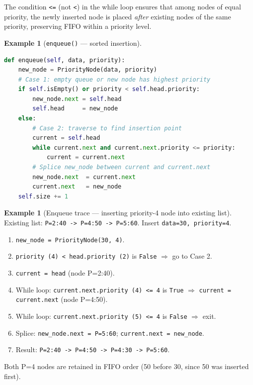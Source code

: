 \documentclass[11pt, a4paper, notitlepage]{report}
\theoremstyle{definition}
\theoremstyle{remark}
\theoremstyle{definition}
\newtheorem{example}[theorem]{Example}
\begin{document}
The condition \texttt{<=} (not \texttt{<}) in the while loop ensures that among nodes of
equal priority, the newly inserted node is placed \emph{after} existing nodes of the same
priority, preserving FIFO within a priority level.

\begin{example}[\texttt{enqueue()} --- sorted insertion]
\label{ex:pq-enqueue}
\leavevmode
\begin{lstlisting}[language=Python]
def enqueue(self, data, priority):
    new_node = PriorityNode(data, priority)
    # Case 1: empty queue or new node has highest priority
    if self.isEmpty() or priority < self.head.priority:
        new_node.next = self.head
        self.head     = new_node
    else:
        # Case 2: traverse to find insertion point
        current = self.head
        while current.next and current.next.priority <= priority:
            current = current.next
        # Splice new_node between current and current.next
        new_node.next  = current.next
        current.next   = new_node
    self.size += 1
\end{lstlisting}
\end{example}

\begin{example}[Enqueue trace --- inserting priority-4 node into existing list]
\label{ex:pq-enqueue-trace}
Existing list: \texttt{P=2:40 -> P=4:50 -> P=5:60}.  Insert \texttt{data=30, priority=4}.

\begin{enumerate}
  \item \texttt{new\_node = PriorityNode(30, 4)}.
  \item \texttt{priority (4) < head.priority (2)} is \texttt{False} $\Rightarrow$ go to Case 2.
  \item \texttt{current = head} (node P=2:40).
  \item While loop: \texttt{current.next.priority (4) <= 4} is \texttt{True}
        $\Rightarrow$ \texttt{current = current.next} (node P=4:50).
  \item While loop: \texttt{current.next.priority (5) <= 4} is \texttt{False} $\Rightarrow$ exit.
  \item Splice: \texttt{new\_node.next = P=5:60}; \texttt{current.next = new\_node}.
  \item Result: \texttt{P=2:40 -> P=4:50 -> P=4:30 -> P=5:60}.
\end{enumerate}

Both P=4 nodes are retained in FIFO order (50 before 30, since 50 was inserted first).
\end{example}
\end{document}
